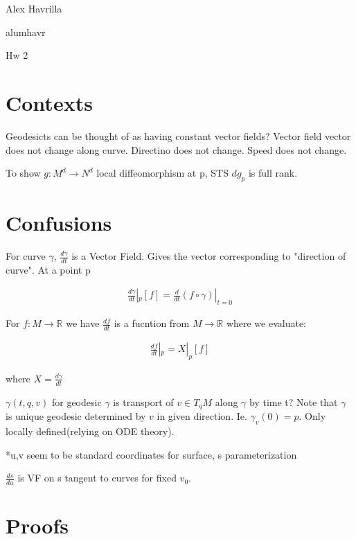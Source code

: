 \documentclass[11pt]{article}
\newcommand{\R}{\mathbb{R}}
\newcommand{\myname}{Alex Havrilla}
\newcommand{\myandrew}{alumhavr}
\newcommand{\myhwnum}{Hw 2}
\begin{document}
\medskip                        

\thispagestyle{plain}
\begin{center}

{\myname}

\myandrew

\myhwnum

\end{center}

\section{Contexts}

Geodesicts can be thought of as having constant vector fields?
	Vector field vector does not change along curve.
	Directino does not change. Speed does not change.

To show $g : M^d \to N^d$ local diffeomorphism at p, STS $dg_p$ is full rank.

\section{Confusions}

For curve $\gamma$, $\frac{d\gamma}{dt}$ is a Vector Field. Gives the vector corresponding to "direction of curve". At a point p

\begin{align*}
	\frac{d\gamma}{dt}|_p[f] = \frac{d}{dt}(f \circ \gamma) |_{t = 0}
\end{align*}

For $f : M \to \R$ we have $\frac{d f}{dt}$ is a fucntion from $M \to \R$ where we evaluate:

\begin{align*}
	\frac{df}{dt}|_p = X|_p[f]
\end{align*}

where $X = \frac{d \gamma}{dt}$

$\gamma(t,q,v)$ for geodesic $\gamma$ is transport of $v \in T_qM$ along $\gamma$ by time t? Note that $\gamma$ is unique geodesic determined by $v$ in given direction. Ie. $\gamma_v(0) = p$. Only locally defined(relying on ODE theory).

*u,v seem to be standard coordinates for surface, s parameterization

$\frac{ds}{du}$ is VF on s tangent to curves for fixed $v_0$. 

\section{Proofs}
\end{document}
